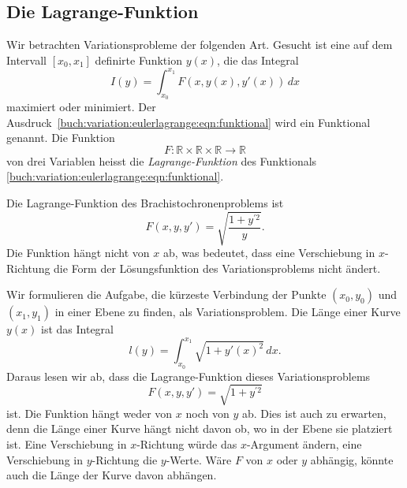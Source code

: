 %
%
%

%
%
\subsection{Die Lagrange-Funktion
\label{buch:variation:eulerlagrange:subsection:lagrange-funktion}}
Wir betrachten Variationsprobleme der folgenden Art.
Gesucht ist eine auf dem Intervall $[x_0,x_1]$ definirte
Funktion $y(x)$, die das Integral
\begin{equation}
I(y)
=
\int_{x_0}^{x_1}
F(x, y(x), y'(x))
\,dx
\label{buch:variation:eulerlagrange:eqn:funktional}
\end{equation}
maximiert oder minimiert.
Der Ausdruck~\eqref{buch:variation:eulerlagrange:eqn:funktional}
wird ein Funktional genannt.
Die Funktion
\[
F
\colon
\mathbb{R}\times
\mathbb{R}\times
\mathbb{R}
\to
\mathbb{R}
\]
von drei Variablen heisst die {\em Lagrange-Funktion}
des Funktionals \eqref{buch:variation:eulerlagrange:eqn:funktional}.

\begin{beispiel}
Die Lagrange-Funktion des Brachistochronenproblems ist
\[
F(x,y,y')
=
\sqrt{ \frac{1+y^{\prime 2}}{y} }.
\]
Die Funktion hängt nicht von $x$ ab, was bedeutet, dass eine
Verschiebung in $x$-Richtung die Form der Lösungsfunktion des
Variationsproblems nicht ändert.
\end{beispiel}

\begin{beispiel}
\label{buch:variation:eulerlagrange:beispiel:gerade}
Wir formulieren die Aufgabe, die kürzeste Verbindung der Punkte
$(x_0,y_0)$ und $(x_1,y_1)$ in einer Ebene zu finden, als Variationsproblem.
Die Länge einer Kurve $y(x)$ ist das Integral
\[
l(y)
=
\int_{x_0}^{x_1}
\sqrt{1+y'(x)^2}\,dx.
\]
Daraus lesen wir ab, dass die Lagrange-Funktion dieses Variationsproblems
\begin{equation}
F(x,y,y') = \sqrt{1+y^{\prime 2}}
\label{buch:variation:eulerlagrange:eqn:geradeL}
\end{equation}
ist.
Die Funktion hängt weder von $x$ noch von $y$ ab.
Dies ist auch zu erwarten, denn die Länge einer Kurve hängt nicht davon
ob, wo in der Ebene sie platziert ist.
Eine Verschiebung in $x$-Richtung würde das $x$-Argument ändern,
eine Verschiebung in $y$-Richtung die $y$-Werte.
Wäre $F$ von $x$ oder $y$ abhängig, könnte auch die Länge der Kurve
davon abhängen.
\end{beispiel}

